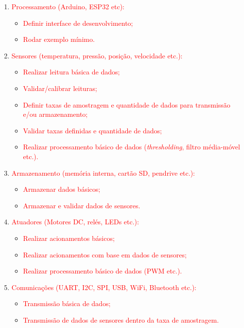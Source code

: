 \begin{enumerate}
    \item \textcolor{red}{Processamento (Arduino, ESP32 etc):}
    \begin{itemize}
        \item \textcolor{red}{Definir interface de desenvolvimento;}
        \item \textcolor{red}{Rodar exemplo mínimo.}
    \end{itemize}
    \item \textcolor{red}{Sensores (temperatura, pressão, posição, velocidade etc.):}
    \begin{itemize}
        \item \textcolor{red}{Realizar leitura básica de dados;}
        \item \textcolor{red}{Validar/calibrar leituras;}
        \item \textcolor{red}{Definir taxas de amostragem e quantidade de dados para transmissão e/ou armazenamento;}
        \item \textcolor{red}{Validar taxas definidas e quantidade de dados;}
        \item \textcolor{red}{Realizar processamento básico de dados (\textit{thresholding}, filtro média-móvel etc.).}
    \end{itemize}
    \item \textcolor{red}{Armazenamento (memória interna, cartão SD, pendrive etc.):}
    \begin{itemize}
        \item \textcolor{red}{Armazenar dados básicos;}
        \item \textcolor{red}{Armazenar e validar dados de sensores.}
    \end{itemize}
    \item \textcolor{red}{Atuadores (Motores DC, relés, LEDs etc.):}
    \begin{itemize}
        \item \textcolor{red}{Realizar acionamentos básicos;}
        \item \textcolor{red}{Realizar acionamentos com base em dados de sensores;}
        \item \textcolor{red}{Realizar processamento básico de dados (PWM etc.).}
    \end{itemize}
    \item \textcolor{red}{Comunicações (UART, I2C, SPI, USB, WiFi, Bluetooth etc.):}
    \begin{itemize}
        \item \textcolor{red}{Transmissão básica de dados;}
        \item \textcolor{red}{Transmissão de dados de sensores dentro da taxa de amostragem.}
    \end{itemize}
\end{enumerate}


